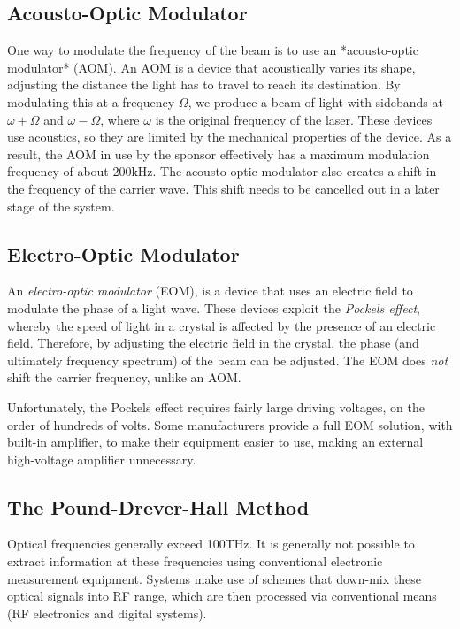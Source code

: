 \subsection{Acousto-Optic Modulator}

One way to modulate the frequency of the beam is to use an *acousto-optic modulator* (AOM).  An AOM is a device that acoustically varies its shape, adjusting the distance the light has to travel to reach its destination.  By modulating this at a frequency $\Omega$, we produce a beam of light with sidebands at $\omega + \Omega$ and $\omega - \Omega$, where $\omega$ is the original frequency of the laser. These devices use acoustics, so they are limited by the mechanical properties of the device.  As a result, the AOM in use by the sponsor effectively has a maximum modulation frequency of about 200kHz.  The acousto-optic modulator also creates a shift in the frequency of the carrier wave.  This shift needs to be cancelled out in a later stage of the system.

\subsection{Electro-Optic Modulator}

An \emph{electro-optic modulator} (EOM), is a device that uses an electric field to modulate the phase of a light wave.  These devices exploit the \emph{Pockels effect}, whereby the speed of light in a crystal is affected by the presence of an electric field.  Therefore, by adjusting the electric field in the crystal, the phase (and ultimately frequency spectrum) of the beam can be adjusted.  The EOM does \emph{not} shift the carrier frequency, unlike an AOM.

Unfortunately, the Pockels effect requires fairly large driving voltages, on the order of hundreds of volts.  Some manufacturers provide a full EOM solution, with built-in amplifier, to make their equipment easier to use, making an external high-voltage amplifier unnecessary.

\subsection{The Pound-Drever-Hall Method}

Optical frequencies generally exceed 100THz. It is generally not possible to
extract information at these frequencies using conventional
electronic measurement equipment.  Systems make use of
schemes that down-mix these optical signals into RF range, which are then
processed via conventional means (RF electronics and digital systems). \\

